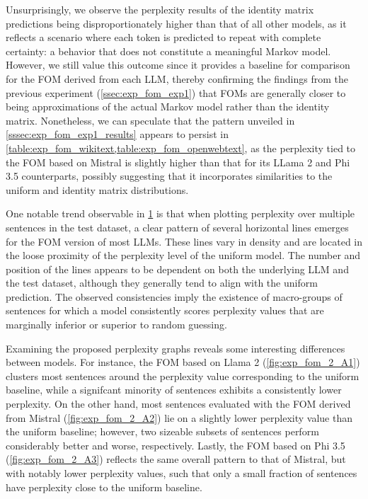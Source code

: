 Unsurprisingly, we observe the perplexity results of the identity matrix predictions being disproportionately higher than that of all other models, as it reflects a scenario where each token is predicted to repeat with complete certainty: a behavior that does not constitute a meaningful Markov model.
However, we still value this outcome since it provides a baseline for comparison for the FOM derived from each LLM, thereby confirming the findings from the previous experiment (\cref{ssec:exp_fom_exp1}) that FOMs are generally closer to being approximations of the actual Markov model rather than the identity matrix.
Nonetheless, we can speculate that the pattern unveiled in \cref{sssec:exp_fom_exp1_results} appears to persist in \cref{table:exp_fom_wikitext,table:exp_fom_openwebtext}, as the perplexity tied to the FOM based on Mistral is slightly higher than that for its LLama 2 and Phi 3.5 counterparts, possibly suggesting that it incorporates similarities to the uniform and identity matrix distributions.

One notable trend observable in \cref{fig:exp_fom_2_A} is that when plotting perplexity over multiple sentences in the test dataset, a clear pattern of several horizontal lines emerges for the FOM version of most LLMs.
These lines vary in density and are located in the loose proximity of the perplexity level of the uniform model.
The number and position of the lines appears to be dependent on both the underlying LLM and the test dataset, although they generally tend to align with the uniform prediction.
The observed consistencies imply the existence of macro-groups of sentences for which a model consistently scores perplexity values that are marginally inferior or superior to random guessing.

\begin{figure}[t!]
    \centering
    \quad
    \caption{}
    \label{fig:exp_fom_2_A}
\end{figure}

Examining the proposed perplexity graphs reveals some interesting differences between models.
For instance, the FOM based on Llama 2 (\cref{fig:exp_fom_2_A1}) clusters most sentences around the perplexity value corresponding to the uniform baseline, while a signifcant minority of sentences exhibits a consistently lower perplexity.
On the other hand, most sentences evaluated with the FOM derived from Mistral (\cref{fig:exp_fom_2_A2}) lie on a slightly lower perplexity value than the uniform baseline; however, two sizeable subsets of sentences perform considerably better and worse, respectively.
Lastly, the FOM based on Phi 3.5 (\cref{fig:exp_fom_2_A3}) reflects the same overall pattern to that of Mistral, but with notably lower perplexity values, such that only a small fraction of sentences have perplexity close to the uniform baseline.

